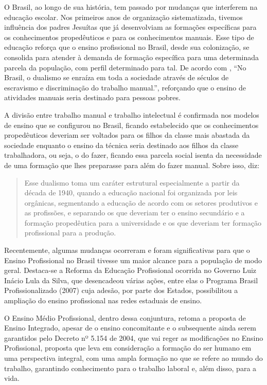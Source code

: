 \begin{refsection}
    O Brasil, ao longo de sua história, tem passado por mudanças que interferem na educação escolar. Nos primeiros anos de organização sistematizada, tivemos influência dos padres Jesuítas que já desenvolviam as formações específicas para os conhecimentos propedêuticos e para os conhecimentos manuais. Esse tipo de educação reforça que o ensino profissional no Brasil, desde sua colonização, se consolida para atender à demanda de formação específica para uma determinada parcela da população, com perfil determinado para tal. De acordo com \textcite[p.~32]{FRIGOTTOAndCIAVATTAAndRAMOS2005Ensino}, “No Brasil, o dualismo se enraíza em toda a sociedade através de séculos de escravismo e discriminação do trabalho manual.”, reforçando que o ensino de atividades manuais seria destinado para pessoas pobres.  

    A divisão entre trabalho manual e trabalho intelectual é confirmada nos modelos de ensino que se configurou no Brasil, ficando estabelecido que os conhecimentos propedêuticos deveriam ser voltados para os filhos da classe mais abastada da sociedade enquanto o ensino da técnica seria destinado aos filhos da classe trabalhadora, ou seja, o do fazer, ficando essa parcela social isenta da necessidade de uma formação que lhes preparasse para além do fazer manual. Sobre isso, \textcite[p.~4]{CIAVATTA2005formação} diz: 

    \begin{quotation}
        Esse dualismo toma um caráter estrutural especialmente a partir da década de 1940, quando a educação nacional foi organizada por leis orgânicas, segmentando a educação de acordo com os setores produtivos e as profissões, e separando os que deveriam ter o ensino secundário e a formação propedêutica para a universidade e os que deveriam ter formação profissional para a produção. 
    \end{quotation}

    Recentemente, algumas mudanças ocorreram e foram significativas para que o Ensino Profissional no Brasil tivesse um maior alcance para a população de modo geral. Destaca-se a Reforma da Educação Profissional ocorrida no Governo Luiz Inácio Lula da Silva, que desencadeou várias ações, entre elas o Programa Brasil Profissionalizado (2007) cuja adesão, por parte dos Estados, possibilitou a ampliação do ensino profissional nas redes estaduais de ensino.  

    O Ensino Médio Profissional, dentro dessa conjuntura, retoma a proposta de Ensino Integrado, apesar de o ensino concomitante e o subsequente ainda serem garantidos pelo Decreto nº 5.154 de 2004, que vai reger as modificações no Ensino Profissional, proposta que leva em consideração a formação do ser humano em uma perspectiva integral, com uma ampla formação no que se refere ao mundo do trabalho, garantindo conhecimento para o trabalho laboral e, além disso, para a vida.  


\end{refsection}
